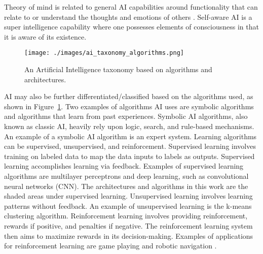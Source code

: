 Theory of mind is related to general AI capabilities around functionality that
can relate to or understand the thoughts and emotions of others
\cite{cuzzolin2020knowing}. Self-aware AI is a super intelligence capability
where one possesses elements of consciousness in that it is aware of its
existence\cite{russell2016artificial}.

\begin{figure}[h]
    \texttt{[image: ./images/ai\_taxonomy\_algorithms.png]}
    \caption{An Artificial Intelligence taxonomy based on algorithms and architectures.}
    \label{fig:ai_taxonomy_algo}
\end{figure}

AI may also be further differentiated/classified based on the algorithms used,
as shown in Figure~\ref{fig:ai_taxonomy_algo}. Two examples of algorithms AI
uses are symbolic algorithms and algorithms that learn from past experiences.
Symbolic AI algorithms, also known as classic AI, heavily rely upon logic,
search, and rule-based mechanisms. An example of a symbolic AI algorithm is an
expert system. Learning algorithms can be supervised, unsupervised, and
reinforcement. Supervised learning involves training on labeled data to map the
data inputs to labels as outputs. Supervised learning accomplishes learning via
feedback. Examples of supervised learning algorithms are multilayer perceptrons
and deep learning, such as convolutional neural networks (CNN). The
architectures and algorithms in this work are the shaded areas under supervised
learning. Unsupervised learning involves learning patterns without feedback. An
example of unsupervised learning is the k-means clustering algorithm.
Reinforcement learning involves providing reinforcement, rewards if positive,
and penalties if negative. The reinforcement learning system then aims to
maximize rewards in its decision-making. Examples of applications for
reinforcement learning are game playing and robotic navigation \cite
{russell2016artificial}.



